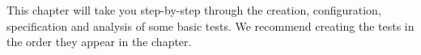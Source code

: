 This chapter will take you step-by-step through the creation, configuration, specification and analysis of some basic tests. We recommend creating the tests in the order they appear in the chapter. 